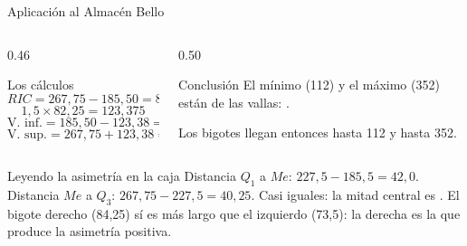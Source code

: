 \documentclass[aspectratio=169,10pt]{beamer}
\begin{document}
\begin{frame}{Aplicación al Almacén Bello}
  \scriptsize
  \begin{columns}[T,onlytextwidth]
    \begin{column}{0.46\textwidth}
      \begin{exampleblock}{Los cálculos}
        \scriptsize
        \[ RIC = 267{,}75-185{,}50 = 82{,}25 \]
        \[ 1{,}5 \times 82{,}25 = 123{,}375 \]
        \[ \text{V. inf.} = 185{,}50-123{,}38 = 62{,}12 \]
        \[ \text{V. sup.} = 267{,}75+123{,}38 = 391{,}13 \]
      \end{exampleblock}
    \end{column}
    \begin{column}{0.50\textwidth}
      \begin{block}{Conclusión}
        \scriptsize
        El mínimo (112) y el máximo (352) están  de las vallas:
        .

        \vspace{0.1cm}
        Los bigotes llegan entonces hasta 112 y hasta 352.
      \end{block}
    \end{column}
  \end{columns}

  \vspace{0.1cm}
  \begin{alertblock}{Leyendo la asimetría en la caja}
    \scriptsize
    Distancia $Q_1$ a $Me$: $227{,}5-185{,}5 = 42{,}0$. \quad
    Distancia $Me$ a $Q_3$: $267{,}75-227{,}5 = 40{,}25$. \quad
    Casi iguales: la mitad central es . El bigote
    derecho (84,25) sí es más largo que el izquierdo (73,5): la
     derecha es la que produce la asimetría positiva.
  \end{alertblock}
\end{frame}
\end{document}
